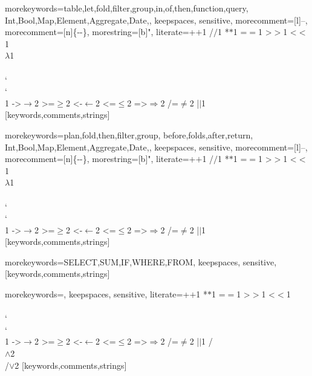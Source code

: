 
%
  {morekeywords={table,let,fold,filter,group,in,of,then,function,query,%
                Int,Bool,Map,Element,Aggregate,Date,},%
   keepspaces,%
   sensitive,%
   morecomment=[l]--,%
   morecomment=[n]{\{-}{-\}},%
   morestring=[b]",%
   literate={+}{{$+$}}1 {/}{{$/$}}1 {*}{{$*$}}1 {=}{{$=$}}1
            {>}{{$>$}}1 {<}{{$<$}}1 {\\}{{$\lambda$}}1
            {\\\\}{{\char`\\\char`\\}}1
            {->}{{$\rightarrow$}}2 {>=}{{$\geq$}}2 {<-}{{$\leftarrow$}}2
            {<=}{{$\leq$}}2 {=>}{{$\Rightarrow$}}2 
            {/=}{{$\ne$}}2
            {|}{{$\mid$}}1
  }[keywords,comments,strings]%

%
  {morekeywords={plan,fold,then,filter,group,%
                before,folds,after,return,%
                Int,Bool,Map,Element,Aggregate,Date,},%
   keepspaces,%
   sensitive,%
   morecomment=[l]--,%
   morecomment=[n]{\{-}{-\}},%
   morestring=[b]",%
   literate={+}{{$+$}}1 {/}{{$/$}}1 {*}{{$*$}}1 {=}{{$=$}}1
            {>}{{$>$}}1 {<}{{$<$}}1 {\\}{{$\lambda$}}1
            {\\\\}{{\char`\\\char`\\}}1
            {->}{{$\rightarrow$}}2 {>=}{{$\geq$}}2 {<-}{{$\leftarrow$}}2
            {<=}{{$\leq$}}2 {=>}{{$\Rightarrow$}}2 
            {/=}{{$\ne$}}2
            {|}{{$\mid$}}1
  }[keywords,comments,strings]%

%
  {morekeywords={SELECT,SUM,IF,WHERE,FROM},%
   keepspaces,%
   sensitive,%
  }[keywords,comments,strings]%

%
  {morekeywords={},%
   keepspaces,%
   sensitive,%
   literate={+}{{$+$}}1 {*}{{$*$}}1 {=}{{$=$}}1
            {>}{{$>$}}1 {<}{{$<$}}1
            {\\\\}{{\char`\\\char`\\}}1
            {->}{{$\rightarrow$}}2 {>=}{{$\geq$}}2 {<-}{{$\leftarrow$}}2
            {<=}{{$\leq$}}2 {=>}{{$\Rightarrow$}}2 
            {/=}{{$\ne$}}2
            {|}{{$\mid$}}1
            {/\\}{{$\wedge$}}2
            {\\/}{{$\vee$}}2
  }[keywords,comments,strings]%

